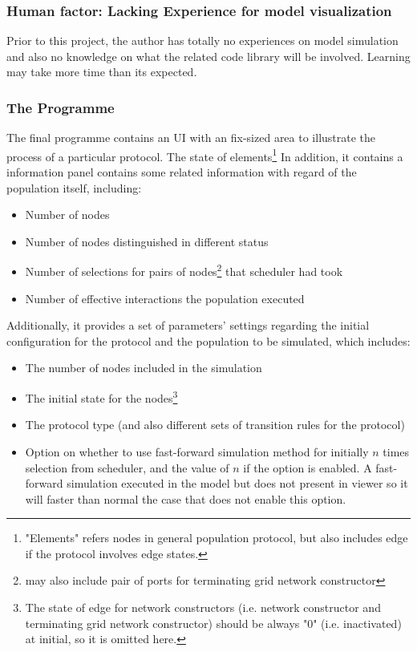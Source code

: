 \subsubsection{Human factor: Lacking Experience for model visualization}
\par
Prior to this project, the author has totally no experiences on model simulation and
also no knowledge on what the related code library will be involved. Learning may take
more time than its expected.

\subsubsection{The Programme}
\par
The final programme contains an UI with an fix-sized area to illustrate the process of
a particular protocol. The state of elements\footnote{\noindent "Elements" refers nodes in general population protocol,
but also includes edge if the protocol involves edge states.}
In addition, it contains a information panel contains some related
information with regard of the population itself, including:
\begin{itemize}
  \item Number of nodes
  \item Number of nodes distinguished in different status
  \item Number of selections for pairs of nodes\footnote{may also include pair of ports for terminating grid network constructor} that scheduler had took
  \item Number of effective interactions the population executed
\end{itemize}
\par
Additionally, it provides a set of parameters' settings regarding the initial configuration for the protocol and the population to be simulated, which includes:
\begin{itemize}
  \item The number of nodes included in the simulation
  \item The initial state for the nodes\footnote{\noindent The state of edge for network constructors (i.e. network constructor and terminating grid network constructor) should be always "0" (i.e. inactivated) at initial, so it is omitted here.}
  \item The protocol type (and also different sets of transition rules for the protocol)
  \item Option on whether to use fast-forward simulation method for initially $n$ times selection from scheduler, and the value of $n$ if the option is enabled.
  A fast-forward simulation executed in the model but does not present in viewer so it will faster than normal the case that does not enable this option.
\end{itemize}

